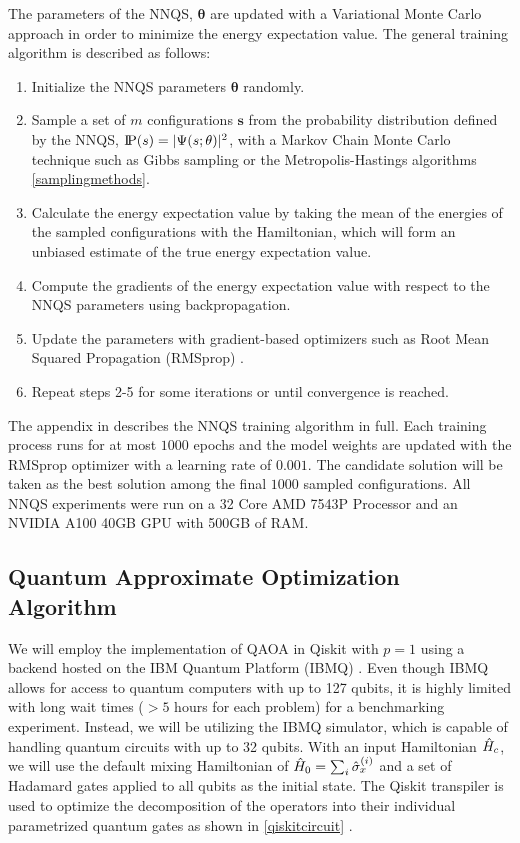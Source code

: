 The parameters of the NNQS, $\mathbf{\theta}$ are updated with a Variational Monte Carlo approach in order to minimize the energy expectation value. The general training algorithm is described as follows:
\begin{enumerate}
    \item Initialize the NNQS parameters $\mathbf{\theta}$ randomly.
    \item Sample a set of $m$ configurations $\mathbf{s}$ from the probability distribution defined by the NNQS, $\text{I\kern-0.15em P}(s) = |\Psi(s;\theta)|^2$, with a Markov Chain Monte Carlo technique such as Gibbs sampling or the Metropolis-Hastings algorithms \autoref{samplingmethods}.
    \item Calculate the energy expectation value by taking the mean of the  energies of the sampled configurations with the Hamiltonian, which will form an unbiased estimate of the true energy expectation value.
    \item Compute the gradients of the energy expectation value with respect to the NNQS parameters using backpropagation.
    \item Update the parameters with gradient-based optimizers such as Root Mean Squared Propagation (RMSprop) \cite{rmsprop}.
    \item Repeat steps 2-5 for some iterations or until convergence is reached.
\end{enumerate}
The appendix in \cite{b20} describes the NNQS training algorithm in full. Each training process runs for at most $1000$ epochs and the model weights are updated with the RMSprop optimizer with a learning rate of $0.001$. The candidate solution will be taken as the best solution among the final $1000$ sampled configurations. All NNQS experiments were run on a 32 Core AMD 7543P Processor and an NVIDIA A100 40GB GPU with 500GB of RAM.

\subsection{Quantum Approximate Optimization Algorithm}
We will employ the implementation of QAOA in Qiskit with $p=1$ using a backend hosted on the IBM Quantum Platform (IBMQ) \cite{b24}. Even though IBMQ allows for access to quantum computers with up to 127 qubits, it is highly limited with long wait times ($>5$ hours for each problem) for a benchmarking experiment. Instead, we will be utilizing the IBMQ simulator, which is capable of handling quantum circuits with up to 32 qubits. With an input Hamiltonian $\Hat{H}_c$, we will use the default mixing Hamiltonian of $\Hat{H}_0 = \sum_{i}\Hat{\sigma}_x^{(i)}$ and a set of Hadamard gates applied to all qubits as the initial state. The Qiskit transpiler is used to optimize the decomposition of the operators into their individual parametrized quantum gates as shown in \autoref{qiskitcircuit} \cite{qiskittranspiler}.

